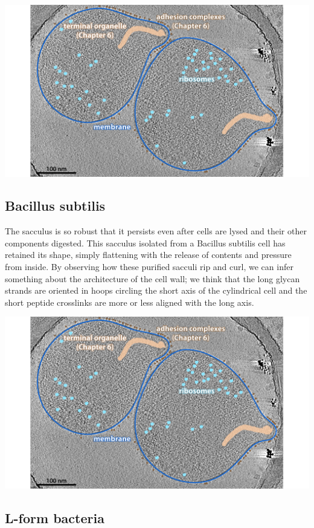 \documentclass[]{tufte-book}
\begin{document}
\includegraphics{img/02_static/2_1_Mgenitalium}

\hypertarget{Peptidoglycan_architecture}{\subsection{Bacillus
subtilis}\label{Peptidoglycan_architecture}}

The sacculus is so robust that it persists even after cells are lysed
and their other components digested. This sacculus isolated from a
Bacillus subtilis cell has retained its shape, simply flattening with
the release of contents and pressure from inside. By observing how these
purified sacculi rip and curl, we can infer something about the
architecture of the cell wall; we think that the long glycan strands are
oriented in hoops circling the short axis of the cylindrical cell and
the short peptide crosslinks are more or less aligned with the long
axis.

\includegraphics{img/02_static/2_1_Mgenitalium}

\subsection{L-form bacteria}\label{l-form-bacteria}
\end{document}
